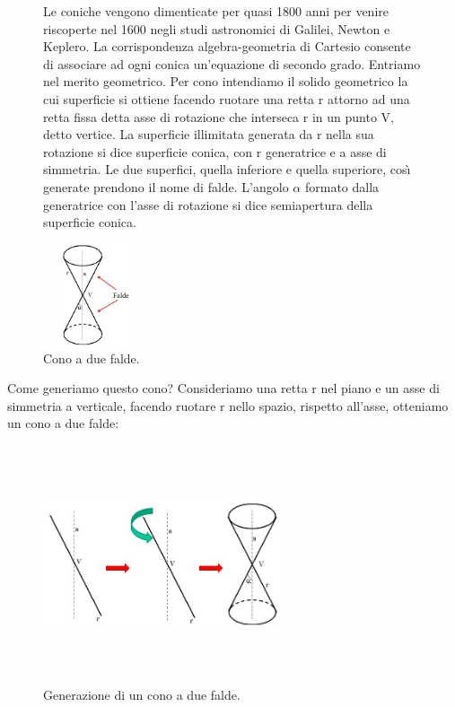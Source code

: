 \begin{figure}[htbp]
  \begin{minipage}{.75\textwidth}
Le coniche vengono dimenticate per quasi 1800 anni per 
venire riscoperte nel 1600 negli studi astronomici di Galilei, Newton e 
Keplero. La corrispondenza algebra-geometria di Cartesio consente di 
associare ad ogni conica un'equazione di secondo grado.
Entriamo nel merito geometrico. Per cono intendiamo il 
solido geometrico la cui superficie si ottiene facendo ruotare una retta r 
attorno ad una retta fissa detta asse di rotazione  che interseca r in un 
punto V, detto vertice. La superficie illimitata generata da r nella sua 
rotazione si dice superficie conica, con r generatrice e a asse di 
simmetria. Le due superfici, quella inferiore e quella superiore, cos\`{\i} 
generate prendono il nome di falde. L'angolo \( \alpha \) formato dalla 
generatrice con l'asse di rotazione si dice semiapertura della superficie 
conica.
  \end{minipage}
  \hspace{.5cm}
  \begin{minipage}{.20\textwidth}
  \begin{inaccessibleblock}
\includegraphics[height=3cm, width=3cm]{img/conoaduefalde.jpg}
    \caption{Cono a due falde.} 
\label{fig:conoaduefalde}
    \end{inaccessibleblock}
  \end{minipage}
\end{figure}
  
Come generiamo questo cono? Consideriamo una retta r nel piano e un asse di 
simmetria a verticale, facendo ruotare r  nello spazio, rispetto all'asse, 
otteniamo un cono a due falde:
\begin{figure}[htbp]
  \begin{inaccessibleblock}
    \centering%
\includegraphics[height=7cm, width=7cm, keepaspectratio]{img/rotazionecono2.jpg}
    \caption{Generazione di un cono a due falde.}%
  \end{inaccessibleblock}
\end{figure}

